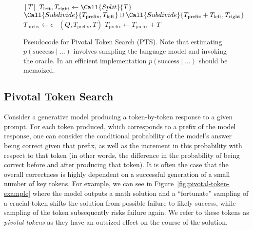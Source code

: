 \begin{figure}
    \begin{algorithmic}
                 
                    \State \Return $[T]$
                \EndIf
                \State $T_\mathrm{left},T_\mathrm{right} \gets \Call{Split}{T}$ 
                \State \Return $\Call{Subdivide}{T_\mathrm{prefix}, T_\mathrm{left}} \cup \Call{Subdivide}{T_\mathrm{prefix} + T_\mathrm{left}, T_\mathrm{right}}$
            \EndProcedure
            \State $T_\mathrm{prefix} \gets \epsilon$
                    \State \Yield~$(Q,T_\mathrm{prefix},T)$ 
                \EndIf
                \State $T_\mathrm{prefix} \gets T_\mathrm{prefix} + T$
            \EndFor
        \EndProcedure
    \end{algorithmic}
    \caption{Pseudocode for Pivotal Token Search (PTS). Note that estimating $p(\mathrm{success} \mid \dots)$ involves sampling the language model and invoking the oracle. In an efficient implementation $p(\mathrm{success} \mid \dots)$ should be memoized.}
    \label{fig:pts-pseudocode}
\end{figure}

\subsection{Pivotal Token Search} \label{sec:pivotal}

Consider a generative model producing a token-by-token response to a given prompt. For each token produced, which corresponds to a prefix of the model response, one can consider the conditional probability of the model's answer being correct given that prefix, as well as the increment in this probability with respect to that token (in other words, the difference in the probability of being correct before and after producing that token). It is often the case that the overall correctness is highly dependent on a successful generation of a small number of key tokens. For example, we can see in Figure~\ref{fig:pivotal-token-example} where the model outputs a math solution and a ``fortunate'' sampling of a crucial token  shifts the solution from possible failure to likely success, while sampling of the token  subsequently risks failure again. We refer to these tokens as \emph{pivotal tokens} as they have an outsized effect on the course of the solution.

